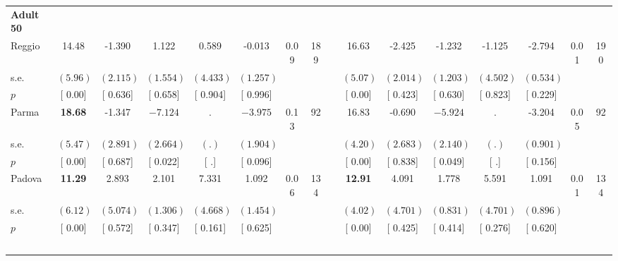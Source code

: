 \begin{longtable}{L{8em} c c c c c c c p{1em} c c c c c c c}
\quad \quad \textbf{Adult 50} & & & & & & & & & & & & & & & \\* 
\quad \quad \quad Reggio& 14.48 &    -1.390 &     1.122 &     0.589 &    -0.013 &      0.09 &       189 & & 16.63 &    -2.425 &    -1.232 &    -1.125 &    -2.794 &      0.01 &       190  \\*
\quad \quad \quad \quad s.e.& $ (     5.96)$ & $ (    2.115)$ & $ (    1.554)$ & $ (    4.433)$ & $ (    1.257)$ & & & & $ (     5.07)$ & $ (    2.014)$ & $ (    1.203)$ & $ (    4.502)$ & $ (    0.534)$ & &  \\*
\quad \quad \quad \quad $ p$ & [     0.00] & [    0.636] & [    0.658] & [    0.904] & [    0.996] & & & & [     0.00] & [    0.423] & [    0.630] & [    0.823] & [    0.229] & &  \\[1em]
\quad \quad \quad Parma& \textbf{    18.68} &    -1.347 & $ \mathbf{   -7.124}$ &         . & $ \mathbf{   -3.975}$ &      0.13 &        92 & & 16.83 &    -0.690 & $ \mathbf{   -5.924}$ &         . &    -3.204 &      0.05 &        92  \\*
\quad \quad \quad \quad s.e.& $ (     5.47)$ & $ (    2.891)$ & $ (    2.664)$ & $ (        .)$ & $ (    1.904)$ & & & & $ (     4.20)$ & $ (    2.683)$ & $ (    2.140)$ & $ (        .)$ & $ (    0.901)$ & &  \\*
\quad \quad \quad \quad $ p$ & [     0.00] & [    0.687] & [    0.022] & [        .] & [    0.096] & & & & [     0.00] & [    0.838] & [    0.049] & [        .] & [    0.156] & &  \\[1em]
\quad \quad \quad Padova& \textbf{    11.29} &     2.893 &     2.101 &     7.331 &     1.092 &      0.06 &       134 & & \textbf{    12.91} &     4.091 &     1.778 &     5.591 &     1.091 &      0.01 &       134  \\*
\quad \quad \quad \quad s.e.& $ (     6.12)$ & $ (    5.074)$ & $ (    1.306)$ & $ (    4.668)$ & $ (    1.454)$ & & & & $ (     4.02)$ & $ (    4.701)$ & $ (    0.831)$ & $ (    4.701)$ & $ (    0.896)$ & &  \\*
\quad \quad \quad \quad $ p$ & [     0.00] & [    0.572] & [    0.347] & [    0.161] & [    0.625] & & & & [     0.00] & [    0.425] & [    0.414] & [    0.276] & [    0.620] & &  \\[1em]
~\\[1em]
\end{longtable}